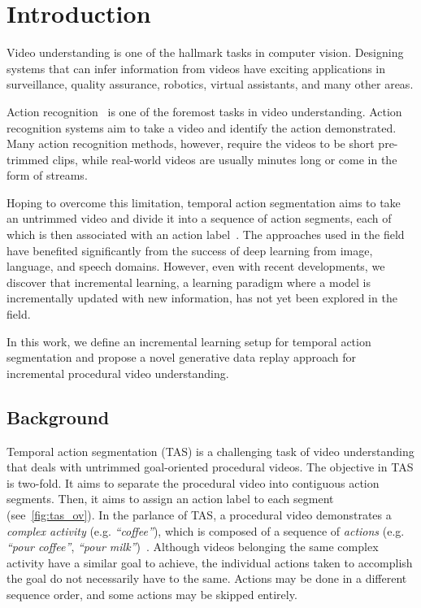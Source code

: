 \chapter{Introduction}

Video understanding is one of the hallmark tasks in computer vision. Designing systems that can infer information from videos have exciting applications in surveillance, quality assurance, robotics, virtual assistants, and many other areas. %

Action recognition~\cite{kongg2022human} is one of the foremost tasks in video understanding. Action recognition systems aim to take a video and identify the action demonstrated. Many action recognition methods, however, require the videos to be short pre-trimmed clips, while real-world videos are usually minutes long or come in the form of streams.

Hoping to overcome this limitation, temporal action segmentation aims to take an untrimmed video and divide it into a sequence of action segments, each of which is then associated with an action label~\cite{ding_temporal_2023}. The approaches used in the field have benefited significantly from the success of deep learning from image, language, and speech domains. However, even with recent developments, we discover that incremental learning, a learning paradigm where a model is incrementally updated with new information, has not yet been explored in the field. 

In this work, we define an incremental learning setup for temporal action segmentation and propose a novel generative data replay approach for incremental procedural video understanding.

\section{Background}


Temporal action segmentation (TAS) is a challenging task of video understanding that deals with untrimmed goal-oriented procedural videos. The objective in TAS is two-fold. It aims to separate the procedural video into contiguous action segments. Then, it aims to assign an action label to each segment (see~\cref{fig:tas_ov}). In the parlance of TAS, a procedural video demonstrates a \emph{complex activity} (e.g. \emph{``coffee''}), which is composed of a sequence of \emph{actions} (e.g. \emph{``pour coffee''}, \emph{``pour milk''})~\cite{ding_temporal_2023}. Although videos belonging the same complex activity have a similar goal to achieve, the individual actions taken to accomplish the goal do not necessarily have to the same. Actions may be done in a different sequence order, and some actions may be skipped entirely.

